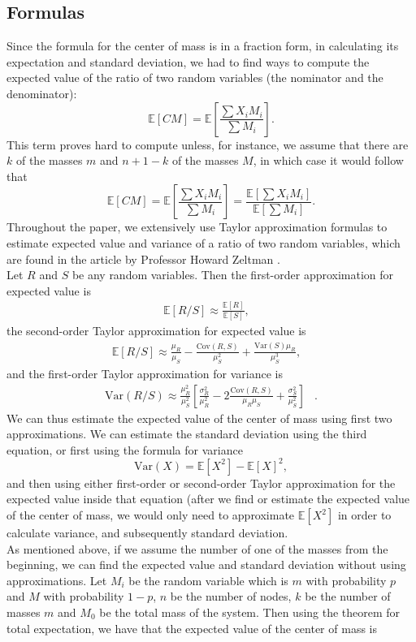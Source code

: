 \documentclass[11pt, twoside, reqno]{book}
\newcommand{\Var}{\text{Var}}
\newcommand{\Cov}{\text{Cov}}
\newcommand{\E}{\mathbb{E}}
\begin{document}
\subsection{Formulas}
Since the formula for the center of mass is in a fraction form, in calculating its expectation and standard deviation, we had to find ways to compute the expected value of the ratio of two random variables (the nominator and the denominator):
$$\E[CM] = \E \left[\frac{\sum X_{i}M_{i}}{\sum M_{i}} \right].$$
This term proves hard to compute unless, for instance, we assume that there are $k$ of the masses $m$ and $n+1-k$ of the masses $M$, in which case it would follow that
$$\E[CM] = \E \left[\frac{\sum X_{i}M_{i}}{\sum M_{i}} \right] =\frac{\E \left[\sum X_{i}M_{i}\right]}{\E\left[\sum M_{i}\right]}.$$
Throughout the paper, we extensively use Taylor approximation formulas to estimate expected value and variance of a ratio of two random variables, which are found in the article by Professor Howard Zeltman \cite{Bib3}. \\
Let $R$ and $S$ be any random variables. Then the first-order approximation for expected value is
\begin{align}
\E [R/S] \approx \frac{\E[R]}{\E[S]}, & \tag{first order}
\end{align}
the second-order Taylor approximation for expected value is
\begin{align}
\E[R/S] \approx \frac{\mu_{R}}{\mu_{S}}-\frac{\Cov(R,S)}{\mu_{S}^{2}}+\frac{\Var(S)\mu_{R}}{\mu_{S}^{3}}, & \tag{second order}
\end{align}
and the first-order Taylor approximation for variance is
\begin{align}
\Var(R/S) \approx \frac{\mu_{R}^{2}}{\mu_{S}^{2}}\left[ \frac{\sigma_{R}^{2}}{\mu_{R}^{2}}-2\frac{\Cov(R,S)}{\mu_{R}\mu_{S}}+\frac{\sigma_{S}^{2}}{\mu_{S}^{2}}\right]  & .\tag{first order}\label{eq:first order}
\end{align}
We can thus estimate the expected value of the center of mass using first two approximations. We can estimate the standard deviation using the third equation, or first using the formula for variance
$$\Var(X) = \E[X^{2}]-\E[X]^{2},$$
and then using either first-order or second-order Taylor approximation for the expected value inside that equation (after we find or estimate the expected value of the center of mass, we would only need to approximate $\E[X^{2}]$ in order to calculate variance, and subsequently standard deviation. \\
As mentioned above, if we assume the number of one of the masses from the beginning, we can find the expected value and standard deviation without using approximations. Let $M_{i}$ be the random variable which is $m$ with probability $p$ and $M$ with probability $1-p$, $n$ be the number of nodes, $k$ be the number of masses $m$ and $M_{0}$ be the total mass of the system. Then using the theorem for total expectation, we have that the expected value of the center of mass is
\end{document}

